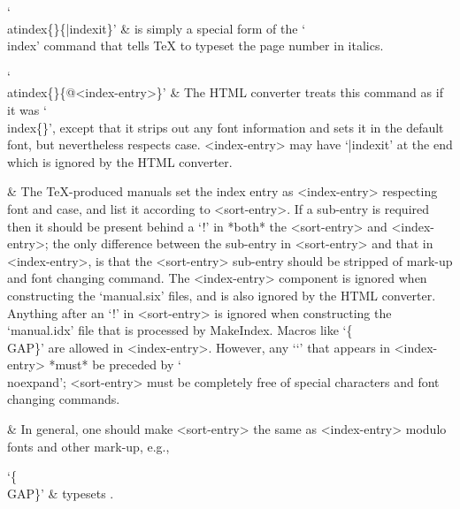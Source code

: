 `\\atindex\{<sort-entry>\}\{|indexit\}' &
    is simply a special form of the `\\index' command that  tells  {\TeX}
    to typeset the page number in italics.

`\\atindex\{<sort-entry>\}\{@<index-entry>\}' &
    The   HTML   converter   treats   this   command   as   if   it   was
    `\\index\{<index-entry>\}',  except  that  it  strips  out  any  font
    information and  sets  it  in  the  default  font,  but  nevertheless
    respects case. <index-entry> may have `|indexit' at the end which is
    ignored by the HTML converter.

  & The {\TeX}-produced manuals set  the  index  entry  as  <index-entry>
    respecting font and case, and list it according to <sort-entry>. If a
    sub-entry is required then it should  be  present  behind  a  `!'  in
    *both*  the  <sort-entry>  and  <index-entry>;  the  only  difference
    between the sub-entry in <sort-entry> and that in  <index-entry>,  is
    that the <sort-entry> sub-entry should be  stripped  of  mark-up  and
    font changing command. The <index-entry> component  is  ignored  when
    constructing the `manual.six' files, and is also ignored by the  HTML
    converter. Anything after an `!'  in  <sort-entry>  is  ignored  when
    constructing the `manual.idx' file that is  processed  by  MakeIndex.
    Macros like `\{\\GAP\}' are allowed in  <index-entry>.  However,  any
    `\lq'  that  appears  in  <index-entry>   *must*   be   preceded   by
    `\\noexpand';  <sort-entry>  must  be  completely  free  of   special
    characters and font changing commands.

  & In general, one should make <sort-entry> the  same  as  <index-entry>
    modulo fonts and other mark-up, e.g.,

\begintt
{}
\endtt

`\{\\GAP\}' &
    typesets {\GAP}.

